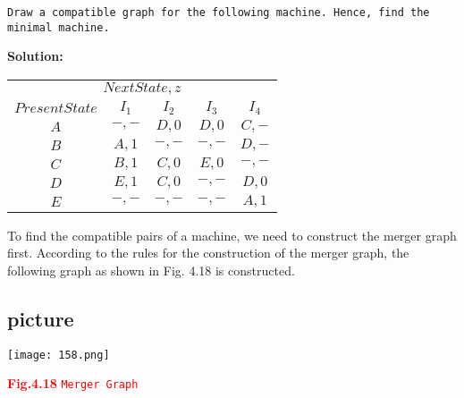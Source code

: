 \documentclass[a4]{article}
\begin{document}
 \hspace*{0.1cm} \texttt{Draw a compatible graph for the following machine. Hence, find the minimal machine.}

\vspace*{0.2cm}
\large{\textbf{Solution:}}

\vspace*{0.1cm}

\begin{center}
\begin{tabular}{ccccc}
 \hline

 \hline

 \hline

 \hline

\multicolumn{5}{c}{$Next State, z$}\\
 \cline{2-5}
       $Present State$   &    $I_1$      &    $I_2$        &        $I_3$   &     $I_4$      \\
 \hline
       $A$         &    $-,-$    &     $D, 0$    &     $D, 0$   &   $C, -$     \\
       $B$         &    $A, 1$   &     $-, -$    &     $-, -$   &   $D, -$     \\
       $C$         &    $B, 1$   &     $C, 0$    &     $E, 0$   &   $-, -$     \\
       $D$         &    $E, 1$   &     $C, 0$    &     $-, -$   &   $D, 0$     \\
       $E$         &    $-, -$   &     $-, -$    &     $-, -$   &   $A, 1$     \\
 \hline

 \hline

 \hline

 \hline
\end{tabular}
\end{center}

\hspace*{0.2cm} To find the compatible pairs of a machine, we need to construct the merger graph first. According
to the rules for the construction of the merger graph, the following graph as shown in Fig. 4.18 is constructed.


\begin{center}
  \section{picture}
\texttt{[image: 158.png]}
\end{center}
\textcolor{red}{\centerline{\textbf{Fig.4.18} \hspace*{0.5cm} \texttt{Merger Graph}}}
\end{document}
